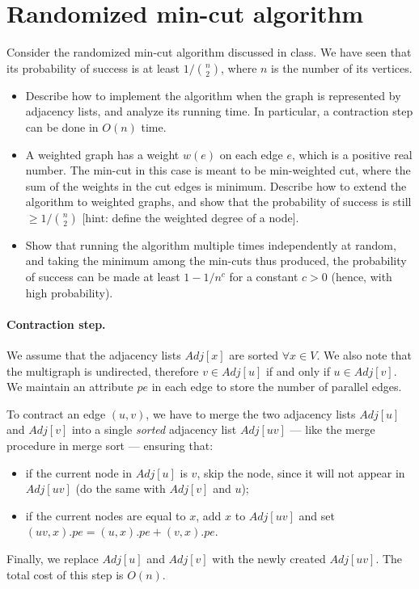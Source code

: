 \section{Randomized min-cut algorithm}

Consider the randomized min-cut algorithm discussed in class. We have seen that its probability of success is at least $1/{n \choose 2}$, where $n$ is the number of its vertices.
\begin{itemize}
  \item Describe how to implement the algorithm when the graph is represented by adjacency lists, and analyze its running time. In particular, a contraction step can be done in $O(n)$ time.
  \item A weighted graph has a weight $w(e)$ on each edge $e$, which is a positive real number. The min-cut in this case is meant to be min-weighted cut, where the sum of the weights in the cut edges is minimum. Describe how to extend the algorithm to weighted graphs, and show that the probability of success is still $\geq 1/{n \choose 2}$ [hint: define the weighted degree of a node].
  \item Show that running the algorithm multiple times independently at random, and taking the minimum among the min-cuts thus produced, the probability of success can be made at least $1 - 1/n^c$ for a constant $c > 0$ (hence, with high probability).
\end{itemize}

\vspace{0.5cm}
\paragraph{Contraction step.} We assume that the adjacency lists $Adj[x]$ are sorted $\forall x \in V$. We also note that the multigraph is undirected, therefore $v\in Adj[u]$ if and only if $u\in Adj[v]$. We maintain an attribute $pe$ in each edge to store the number of parallel edges.

To contract an edge $(u, v)$, we have to merge the two adjacency lists $Adj[u]$ and $Adj[v]$ into a single \emph{sorted} adjacency list $Adj[uv]$ --- like the merge procedure in merge sort --- ensuring that:
\begin{itemize}
  \item if the current node in $Adj[u]$ is $v$, skip the node, since it will not appear in $Adj[uv]$ (do the same with $Adj[v]$ and $u$);
  \item if the current nodes are equal to $x$, add $x$ to $Adj[uv]$ and set $(uv, x).pe = (u,x).pe + (v,x).pe$.
\end{itemize}
Finally, we replace $Adj[u]$ and $Adj[v]$ with the newly created $Adj[uv]$. The total cost of this step is $O(n)$.


